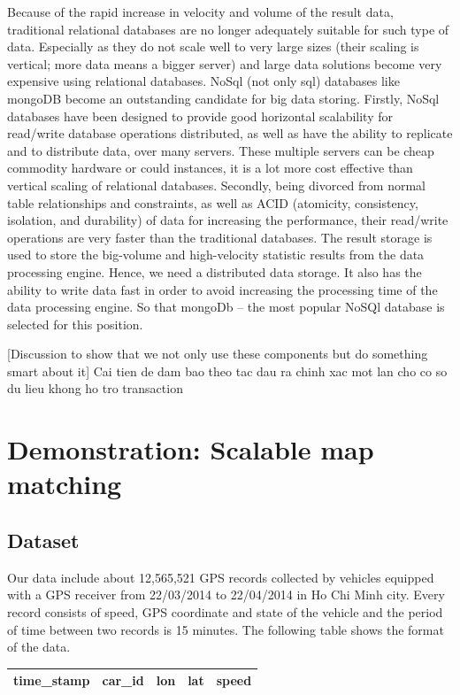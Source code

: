 \documentclass{acm_proc_article-sp}
\begin{document}
 Because of the rapid increase in velocity and volume of the result data, traditional relational databases are no longer adequately suitable for such type of data. Especially as they do not scale well to very large sizes (their scaling is vertical; more data means a bigger server) and large data solutions become very expensive using relational databases. NoSql (not only sql) databases like mongoDB become an outstanding candidate for big data storing. Firstly, NoSql databases have been designed to provide good horizontal scalability for read/write database operations distributed, as well as  have the ability to replicate and to distribute data, over many servers. These multiple servers can be cheap commodity hardware or could instances, it is a lot more cost effective than vertical scaling of relational databases. Secondly, being divorced from normal table relationships and constraints, as well as ACID (atomicity, consistency, isolation, and durability) of data for increasing the performance, their read/write operations are very faster than the traditional databases. 
The result storage is used to store the big-volume and high-velocity statistic results from the data processing engine. Hence, we need a distributed data storage. It also has the ability to write data fast in order to avoid increasing the processing time of the data processing engine. So that mongoDb – the most popular NoSQl database is selected for this position.

[Discussion to show that we not only use these components but do something smart about it]
       Cai tien de dam bao theo tac dau ra chinh xac mot lan cho co so du lieu khong ho tro transaction 

\section{Demonstration: Scalable map matching}
\subsection{Dataset}
Our data include about 12,565,521 GPS records collected by vehicles equipped with a GPS receiver from 22/03/2014 to 22/04/2014 in Ho Chi Minh city. Every record consists of speed, GPS coordinate and state of the vehicle and the period of time between two records is 15 minutes. The following table shows the format of the data.

\begin{table}[h]
\centering
\begin{tabular}{|c|c|c|c|c|}
\hline
\textbf{time\_stamp} & \textbf{car\_id} & \textbf{lon}   & \textbf{lat} & \textbf{speed} \\ \hline
\end{tabular}
\end{table}
\end{document}
